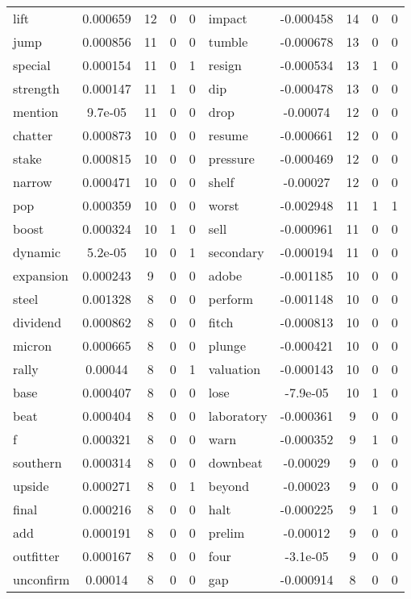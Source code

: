 \documentclass[ oneside,tikz,%
                    author={Joshua Felmeden},
                    degree={MEng},
                     title={Semantic Analysis of Financial Headlines Based on Realised Stock Returns},
                  subtitle={Research}]{dissertation}
\begin{document}
\begin{table}
\begin{tabular}{lcccclcccc}
lift & 0.000659 & 12 & 0 & 0 & impact & -0.000458 & 14 & 0 & 0 \\
jump & 0.000856 & 11 & 0 & 0 & tumble & -0.000678 & 13 & 0 & 0 \\
special & 0.000154 & 11 & 0 & 1 & resign & -0.000534 & 13 & 1 & 0 \\
strength & 0.000147 & 11 & 1 & 0 & dip & -0.000478 & 13 & 0 & 0 \\
mention & 9.7e-05 & 11 & 0 & 0 & drop & -0.00074 & 12 & 0 & 0 \\
chatter & 0.000873 & 10 & 0 & 0 & resume & -0.000661 & 12 & 0 & 0 \\
stake & 0.000815 & 10 & 0 & 0 & pressure & -0.000469 & 12 & 0 & 0 \\
narrow & 0.000471 & 10 & 0 & 0 & shelf & -0.00027 & 12 & 0 & 0 \\
pop & 0.000359 & 10 & 0 & 0 & worst & -0.002948 & 11 & 1 & 1 \\
boost & 0.000324 & 10 & 1 & 0 & sell & -0.000961 & 11 & 0 & 0 \\
dynamic & 5.2e-05 & 10 & 0 & 1 & secondary & -0.000194 & 11 & 0 & 0 \\
expansion & 0.000243 & 9 & 0 & 0 & adobe & -0.001185 & 10 & 0 & 0 \\
steel & 0.001328 & 8 & 0 & 0 & perform & -0.001148 & 10 & 0 & 0 \\
dividend & 0.000862 & 8 & 0 & 0 & fitch & -0.000813 & 10 & 0 & 0 \\
micron & 0.000665 & 8 & 0 & 0 & plunge & -0.000421 & 10 & 0 & 0 \\
rally & 0.00044 & 8 & 0 & 1 & valuation & -0.000143 & 10 & 0 & 0 \\
base & 0.000407 & 8 & 0 & 0 & lose & -7.9e-05 & 10 & 1 & 0 \\
beat & 0.000404 & 8 & 0 & 0 & laboratory & -0.000361 & 9 & 0 & 0 \\
f & 0.000321 & 8 & 0 & 0 & warn & -0.000352 & 9 & 1 & 0 \\
southern & 0.000314 & 8 & 0 & 0 & downbeat & -0.00029 & 9 & 0 & 0 \\
upside & 0.000271 & 8 & 0 & 1 & beyond & -0.00023 & 9 & 0 & 0 \\
final & 0.000216 & 8 & 0 & 0 & halt & -0.000225 & 9 & 1 & 0 \\
add & 0.000191 & 8 & 0 & 0 & prelim & -0.00012 & 9 & 0 & 0 \\
outfitter & 0.000167 & 8 & 0 & 0 & four & -3.1e-05 & 9 & 0 & 0 \\
unconfirm & 0.00014 & 8 & 0 & 0 & gap & -0.000914 & 8 & 0 & 0 \\

\end{tabular}
\end{table}
\end{document}
